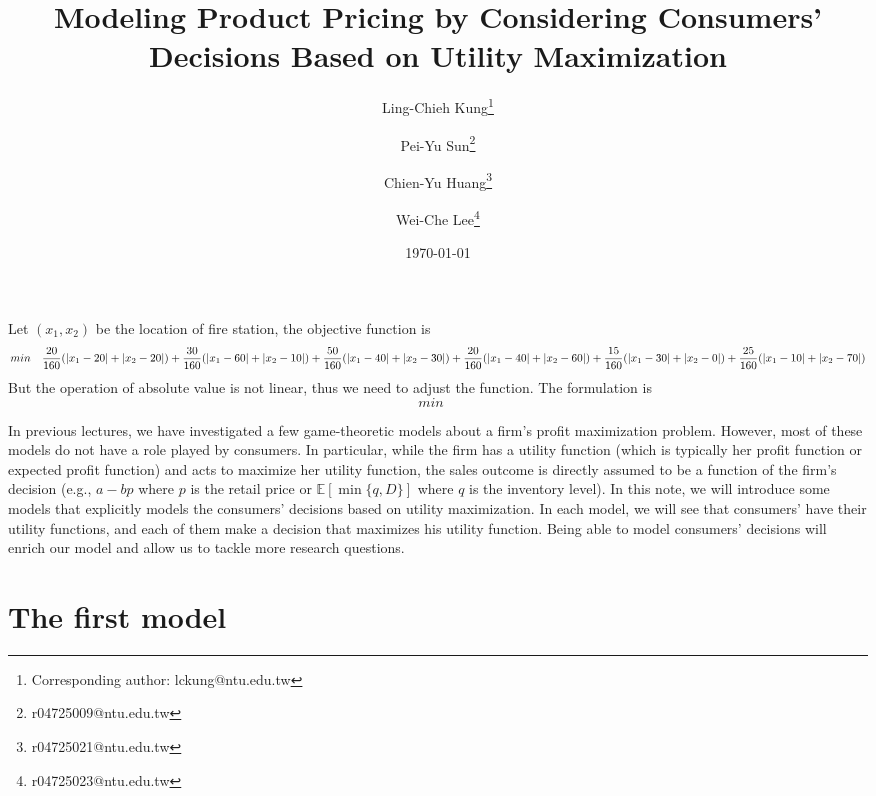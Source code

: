 \documentclass[12pt,a4paper]{article}
\title{Modeling Product Pricing by Considering 
Consumers' Decisions Based on Utility Maximization}
\author[1]{Ling-Chieh Kung\thanks{Corresponding author: lckung@ntu.edu.tw}}
\author[1]{Pei-Yu Sun\thanks{r04725009@ntu.edu.tw}}
\author[1]{Chien-Yu Huang\thanks{r04725021@ntu.edu.tw}}
\author[1]{Wei-Che Lee\thanks{r04725023@ntu.edu.tw}}
\date{\today}
\affil[1]{Department of Information Management, National Taiwan University.}
\date{}
\begin{document}
\maketitle






Let $(x_1,x_2)$ be the location of fire station, the objective function is
\[
min\quad \frac{20}{160}(|x_1-20|+|x_2-20|)+\frac{30}{160}(|x_1-60|+|x_2-10|)+\frac{50}{160}(|x_1-40|+|x_2-30|)+\frac{20}{160}(|x_1-40|+|x_2-60|) \newline +\frac{15}{160}(|x_1-30|+|x_2-0|)+\frac{25}{160}(|x_1-10|+|x_2-70|)
\]
But the operation of absolute value is not linear, thus we need to adjust the function. The formulation
is \newline
\[
min \quad
\]




In previous lectures, we have investigated a few game-theoretic models
about a firm's profit maximization problem. 
However, most of these models do not have a role played by consumers. 
In particular, while the firm has a utility function (which is typically 
her profit function or expected profit function) and acts to maximize her 
utility function, the sales outcome is directly assumed to be a function of the 
firm's decision (e.g., $a - bp$ where $p$ is the retail price or 
$\mathbb{E}[\min\{q, D\}]$ where $q$ is the inventory level). 
In this note, we will introduce some models that explicitly models the 
consumers' decisions based on utility maximization. 
In each model, we will see that consumers' have their utility functions, 
and each of them make a decision that maximizes his utility function. 
Being able to model consumers' decisions will enrich our model and 
allow us to tackle more research questions. 







\section{The first model}
\end{document}
